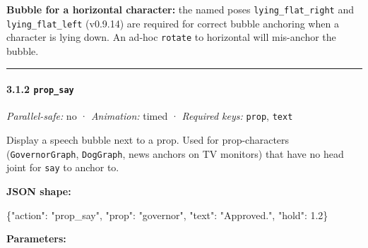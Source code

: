 \documentclass[
  11pt,
]{book}
\newenvironment{Shaded}{}{}
\newcommand{\DataTypeTok}[1]{\textcolor[rgb]{0.56,0.13,0.00}{#1}}
\newcommand{\FloatTok}[1]{\textcolor[rgb]{0.25,0.63,0.44}{#1}}
\newcommand{\FunctionTok}[1]{\textcolor[rgb]{0.02,0.16,0.49}{#1}}
\newcommand{\StringTok}[1]{\textcolor[rgb]{0.25,0.44,0.63}{#1}}
\begin{document}
\textbf{Bubble for a horizontal character:} the named poses
\texttt{lying\_flat\_right} and \texttt{lying\_flat\_left} (v0.9.14) are
required for correct bubble anchoring when a character is lying down. An
ad-hoc \texttt{rotate} to horizontal will mis-anchor the bubble.

\begin{center}\rule{0.5\linewidth}{0.5pt}\end{center}

\paragraph{\texorpdfstring{3.1.2
\texttt{prop\_say}}{3.1.2 prop\_say}}\label{prop_say}

\emph{Parallel-safe:} no · \emph{Animation:} timed · \emph{Required
keys:} \texttt{prop}, \texttt{text}

Display a speech bubble next to a prop. Used for prop-characters
(\texttt{GovernorGraph}, \texttt{DogGraph}, news anchors on TV monitors)
that have no head joint for \texttt{say} to anchor to.

\textbf{JSON shape:}

\begin{Shaded}
\begin{Highlighting}[]
\FunctionTok{\{}\DataTypeTok{"action"}\FunctionTok{:} \StringTok{"prop\_say"}\FunctionTok{,} \DataTypeTok{"prop"}\FunctionTok{:} \StringTok{"governor"}\FunctionTok{,}
 \DataTypeTok{"text"}\FunctionTok{:} \StringTok{"Approved."}\FunctionTok{,} \DataTypeTok{"hold"}\FunctionTok{:} \FloatTok{1.2}\FunctionTok{\}}
\end{Highlighting}
\end{Shaded}

\textbf{Parameters:}
\end{document}
